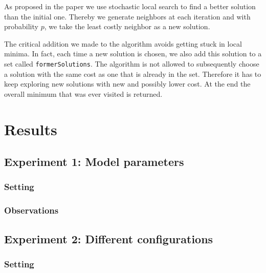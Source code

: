 \documentclass[11pt]{article}
\begin{document}
As proposed in the paper \cite{paper} we use stochastic local search to find 
a better solution than the initial one. Thereby we generate neighbors at each 
iteration and with probability $p$, we take the least costly neighbor as a new 
solution.

The critical addition we made to the algorithm avoids getting stuck in local 
minima. In fact, each time a new solution is chosen, we also add this solution 
to a set called \texttt{formerSolutions}. The algorithm is not allowed to 
subsequently choose a solution with the same cost as one that is already in the 
set. Therefore it has to keep exploring new solutions with new and possibly 
lower cost. At the end the overall minimum that was ever visited is returned.


\section{Results}

\subsection{Experiment 1: Model parameters}

\subsubsection{Setting} 

\subsubsection{Observations}

\subsection{Experiment 2: Different configurations}

\subsubsection{Setting}
\end{document}
